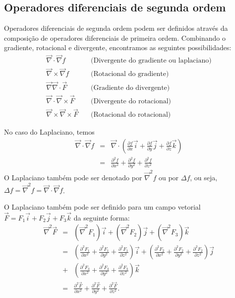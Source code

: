 \subsection{Operadores diferenciais de segunda ordem}
Operadores diferenciais de segunda ordem podem ser definidos através da composição de operadores diferenciais de primeira ordem. Combinando o gradiente, rotacional e divergente, encontramos as seguintes possibilidades:
\begin{eqnarray}
  \vec{\nabla} \cdot \vec{\nabla} f&~& \text{(Divergente do gradiente ou laplaciano)}\\
  \vec{\nabla} \times \vec{\nabla} f&~& \text{(Rotacional do gradiente)}\\
  \vec{\nabla} \vec{\nabla}\cdot \vec{F}&~& \text{(Gradiente do divergente)}\\
  \vec{\nabla} \cdot\vec{\nabla}\times \vec{F}&~& \text{(Divergente do rotacional)}\\
  \vec{\nabla} \times\vec{\nabla}\times \vec{F}&~& \text{(Rotacional do rotacional)}
  \end{eqnarray}

No caso do Laplaciano, temos
\begin{eqnarray}
\nonumber \vec{\nabla} \cdot \vec{\nabla} f&=& \vec{\nabla}\cdot \left(\frac{\partial f}{\partial x}\vec{i}+\frac{\partial f}{\partial y}\vec{j}+\frac{\partial f}{\partial z}\vec{k}\right)\\
&=& \frac{\partial^2 f}{\partial x^2}+\frac{\partial^2 f}{\partial y^2}+\frac{\partial^2 f}{\partial z^2}\label{Laplaciano}
\end{eqnarray}
O Laplaciano também pode ser denotado por $\vec{\nabla}^2 f$ ou por $\Delta f$, ou seja, $\Delta f=\vec{\nabla}^2f=\vec{\nabla} \cdot \vec{\nabla} f$.

O Laplaciano também pode ser definido para um campo vetorial $\vec{F}=F_1\vec{i}+F_2\vec{j}+F_3\vec{k}$ da seguinte forma:
\begin{eqnarray*}
 \vec{\nabla}^2 \vec{F}&=& (\vec{\nabla}^2 F_1)\vec{i}+(\vec{\nabla}^2 F_2)\vec{j}+(\vec{\nabla}^2 F_3)\vec{k}\\
 &=& \left(\frac{\partial^2 F_1}{\partial x^2}+\frac{\partial^2 F_1}{\partial y^2}+\frac{\partial^2 F_1}{\partial z^2}\right)\vec{i}+\left(\frac{\partial^2 F_2}{\partial x^2}+\frac{\partial^2 F_2}{\partial y^2}+\frac{\partial^2 F_2}{\partial z^2}\right)\vec{j}\\&+&\left(\frac{\partial^2 F_3}{\partial x^2}+\frac{\partial^2 F_3}{\partial y^2}+\frac{\partial^2 F_3}{\partial z^2}\right)\vec{k}\\
&=& \frac{\partial^2 \vec{F}}{\partial x^2}+\frac{\partial^2 \vec{F}}{\partial y^2}+\frac{\partial^2 \vec{F}}{\partial z^2}.
\end{eqnarray*}

